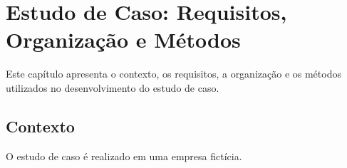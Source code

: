 \chapter{Estudo de Caso: Requisitos, Organização e Métodos}
\label{cap:estudo_caso1}
Este capítulo apresenta o contexto, os requisitos, a organização e os métodos utilizados no desenvolvimento do estudo de caso.

\section{Contexto}
\label{section:contexto}
O estudo de caso é realizado em uma empresa fictícia.